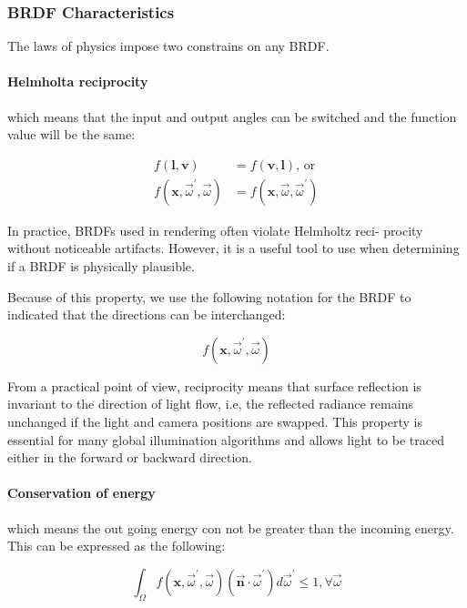 \subsubsection{BRDF Characteristics}
The laws of physics impose two constrains on any BRDF.

\paragraph{\textbf{Helmholta reciprocity}} which means that the input and output angles can be switched and the function value will be the same:

\begin{equation}
	\begin{aligned}
		f(\mathbf{l},\mathbf{v})&=f(\mathbf{v},\mathbf{l}) \text{,  or  }\\
		f(\mathbf{x},\vec{\omega}^{'},\vec{\omega})&=f(\mathbf{x},\vec{\omega},\vec{\omega}^{'})
	\end{aligned}
\end{equation}

In practice, BRDFs used in rendering often violate Helmholtz reci- procity without noticeable artifacts. However, it is a useful tool to use when determining if a BRDF is physically plausible.

Because of this property, we use the following notation for the BRDF to indicated that the directions can be interchanged:

\begin{equation}
	f(\mathbf{x},\vec{\omega}^{'},\vec{\omega})
\end{equation}

From a practical point of view, reciprocity means that surface reflection is invariant to the direction of light flow, i.e, the reflected radiance remains unchanged if the light and camera positions are swapped. This property is essential for many global illumination algorithms and allows light to be traced either in the forward or backward direction.


\paragraph{\textbf{Conservation of energy}} which means the out going energy con not be greater than the incoming energy. This can be expressed as the following:

\begin{equation}
	\int_{\Omega}f(\mathbf{x},\vec{\omega}^{'},\vec{\omega})(\vec{\mathbf{n}}\cdot\vec{\omega}^{'})d\vec{\omega}^{'}\leq 1, \forall\vec{{\omega}}
\end{equation}

